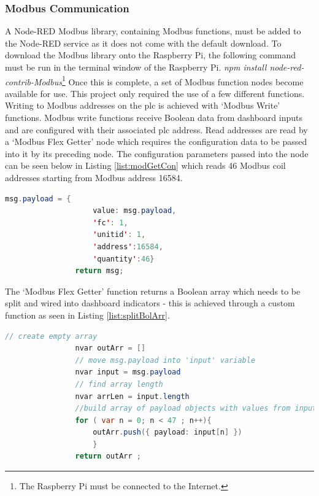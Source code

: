         \subsubsection{Modbus Communication}
            A Node-RED Modbus library, containing Modbus functions, must be added to the Node-RED service as it does not come with the default download. To download the Modbus library onto the Raspberry Pi, the following command must be run in the terminal window of the Raspberry Pi. \newline\textit{npm install node-red-contrib-Modbus}\footnote{The Raspberry Pi must be connected to the Internet.} \newline
            Once this is complete, a set of Modbus function nodes become available for use. This project only required the use of a few different functions. Writing to Modbus addresses on the \acrshort{plc} is achieved with `Modbus Write' functions. Modbus write functions receive Boolean data from dashboard inputs and are configured with their associated \acrshort{plc} address. Read addresses are read by a `Modbus Flex Getter' node which requires the configuration data to be passed into it by its preceding node. The configuration parameters passed into the node can be seen below in Listing \ref{list:modGetCon} which reads 46 Modbus coil addresses starting from Modbus address 16584.

            \begin{lstlisting}[language=Java, caption = Configuration for Modbus Flex Getter, label=list:modGetCon]
                msg.payload = {
                    value: msg.payload,
                    'fc': 1,
                    'unitid': 1,
                    'address':16584,
                    'quantity':46}
                return msg;
            \end{lstlisting}
            
            The `Modbus Flex Getter' function returns a Boolean array which needs to be split and wired into dashboard indicators - this is achieved through a custom function as seen in Listing \ref{list:splitBolArr}.
            
            \begin{lstlisting}[language=Java, caption = Javascript to split Boolean array, label=list:splitBolArr]
                // create empty array 
                nvar outArr = []
                // move msg.payload into 'input' variable
                nvar input = msg.payload
                // find array length
                nvar arrLen = input.length
                //build array of payload objects with values from input
                for ( var n = 0; n < 47 ; n++){
                    outArr.push({ payload: input[n] })
                	}
                return outArr ;
            \end{lstlisting}
            
